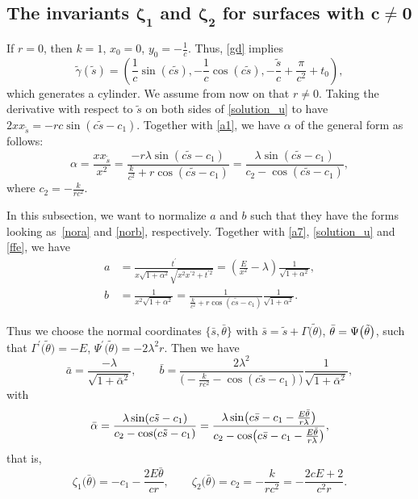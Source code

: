 \documentclass[10pt,a4paper]{amsart}
\numberwithin{equation}{section}
\begin{document}
\subsection[The invariants zeta\_1 and zeta\_2 for surfaces with c neq 0]{The invariants $\boldsymbol{\zeta_{1}}$ and $\boldsymbol{\zeta_{2}}$ for surfaces with $\boldsymbol{c\neq 0}$}
If $r=0$, then $k=1$, $x_0=0$, $y_0=-\frac{1}{c}$. Thus, \eqref{gd} implies
 \[
 \tilde\gamma(\tilde s)=\left(\frac{1}{c}\sin(c\tilde s),-\frac{1}{c}\cos(c\tilde s),-\frac{\tilde s}{c}+\frac{\pi}{c^2}+t_0\right),
 \]
 which generates a cylinder. We assume from now on that $r\neq 0$. Taking the derivative with respect to $\tilde s$ on both sides of
\eqref{solution_u} to have
$
2xx_{\tilde s}=-rc\sin(c\tilde s-c_1)$.
Together with \eqref{a1}, we have $\alpha$ of the general form as follows:
\begin{equation*}
\alpha=\frac{xx_{\tilde s}}{x^2}=\frac{-r\lambda \sin(c\tilde s-c_1)}{\frac{k}{c^2}+r\cos(c\tilde s-c_1)}=\frac{\lambda \sin(c\tilde s-c_1)}{c_2-\cos(c\tilde s-c_1)},
\end{equation*}
where $c_2=-\frac{k}{rc^2}$.

In this subsection, we want to normalize $a$ and $b$ such that they have the
forms looking as~\eqref{nora} and \eqref{norb}, respectively. Together with %
\eqref{a7}, \eqref{solution_u} and \eqref{ffe}, we have
\begin{align*}
a&=\frac{t^{\prime }}{x\sqrt{1+\alpha^2}\sqrt{x^2x^{\prime 2}+t^{\prime 2}}}=\left(\frac{E}{x^{2}}-\lambda \right)\frac{1}{\sqrt{1+\alpha^{2}}}, \\
b&=\frac{1}{x^2\sqrt{1+\alpha^2}}=\frac{1}{\frac{k}{c^2}+r\cos(c\tilde s-c_1)%
}\frac{1}{\sqrt{1+\alpha^{2}}}.
\end{align*}

Thus we choose the normal coordinates $\big\{ \bar{s},\bar{\theta}\big\}$ with
$
\bar{s}=\tilde{s}+\Gamma{\bigl(\tilde{\theta}\bigr)}$, $ \bar{\theta}=\Psi{\bigl(\tilde{%
\theta}\bigr)}$,
such that
$
\Gamma^{\prime }{\bigl(\tilde{\theta}\bigr)}=-E$, $ \Psi^{\prime }{\bigl(\tilde{\theta}\bigr)}%
=-2\lambda^{2}r$.
Then we have
\begin{equation*}
\bar{a}=\frac{-\lambda}{\sqrt{1+\bar \alpha^{2}}}, \qquad
\bar{b}=\frac{2\lambda^{2}}{\bigl(-\frac{k}{rc^2}-\cos(c\tilde s-c_1)\bigr)%
}\frac{1}{\sqrt{1+\bar \alpha^{2}}},
\end{equation*}
with
\[
\bar \alpha=\frac{\lambda \sin(c\tilde s-c_1)}{c_2-\cos(c\tilde s-c_1)}=%
\frac{\lambda \sin \bigl(c\bar s-c_1-\frac{E\bar \theta}{r\lambda}\bigr)}{%
c_2-\cos \bigl(c\bar s-c_1-\frac{E\bar \theta}{r\lambda}\bigr)},
\]
that is,
\begin{equation}\label{coinro}
\zeta_{1}\bigl(\bar \theta\bigr)=-c_1-\frac{2E\bar \theta}{cr},\qquad
\zeta_{2}\bigl(\bar \theta\bigr)=c_{2}=-\frac{k}{rc^2}=-\frac{2cE+2}{c^{2}r}.
\end{equation}
\end{document}
